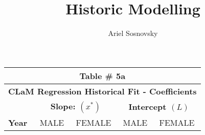 \documentclass[12pt, titlepage]{article}%
\author{Ariel Sosnovsky}
\begin{document}
\title{Historic Modelling}
\maketitle

\clearpage

\begin{table}
  \begin{center}
  \begin{tabular}{||l||c|c||c|c||}
  \hline\hline
  \multicolumn{5}{||c||}{Table \# 5a } \\ \hline\hline
  \multicolumn{5}{||c||}{{\bf CLaM Regression Historical Fit - Coefficients}} \\ \hline\hline
  
  { } & 
  \multicolumn{2}{||c||}{ \bf Slope: $(x^{*})$ } & 
  \multicolumn{2}{||c||}{ \bf Intercept $(L)$ } \\ \hline\hline
  
  {\bf Year } &
  {MALE} & {FEMALE} &
  {MALE} & {FEMALE} \\ \hline\hline


\end{tabular}
\end{center}
\end{table}
\end{document}
